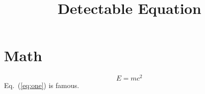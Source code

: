 \documentclass[letterpaper]{article}
\begin{document}
\title{Detectable Equation}\author{}\date{}\maketitle
\section{Math}
\begin{equation}\label{eq:one}
E = mc^2
\end{equation}
Eq.~(\ref{eq:one}) is famous.
\end{document}
